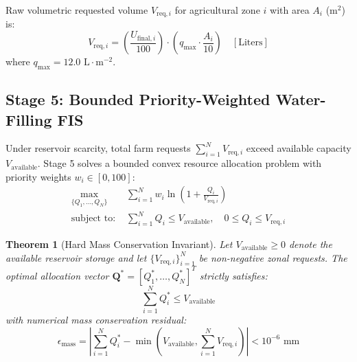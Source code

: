 \documentclass[conference]{IEEEtran}
\newtheorem{theorem}{Theorem}
\begin{document}
Raw volumetric requested volume $V_{\text{req}, i}$ for agricultural zone $i$ with area $A_i$ ($\text{m}^2$) is:
\begin{equation}
V_{\text{req}, i} = \left(\frac{U_{\text{final}, i}}{100}\right) \cdot \left(q_{\max} \cdot \frac{A_i}{10}\right) \quad [\text{Liters}]
\end{equation}
where $q_{\max} = 12.0\text{ L}\cdot\text{m}^{-2}$.

\subsection{Stage 5: Bounded Priority-Weighted Water-Filling FIS}
Under reservoir scarcity, total farm requests $\sum_{i=1}^N V_{\text{req}, i}$ exceed available capacity $V_{\text{available}}$. Stage 5 solves a bounded convex resource allocation problem with priority weights $w_i \in [0, 100]$:
\begin{align}
\max_{\{Q_1, \dots, Q_N\}} & \sum_{i=1}^N w_i \ln\left(1 + \frac{Q_i}{V_{\text{req}, i}}\right) \label{eq:opt_obj} \\
\text{subject to: } & \sum_{i=1}^N Q_i \le V_{\text{available}}, \quad 0 \le Q_i \le V_{\text{req}, i} \label{eq:opt_constraint}
\end{align}

\begin{theorem}[Hard Mass Conservation Invariant]
Let $V_{\text{available}} \ge 0$ denote the available reservoir storage and let $\{V_{\text{req}, i}\}_{i=1}^N$ be non-negative zonal requests. The optimal allocation vector $\mathbf{Q}^* = [Q_1^*, \dots, Q_N^*]^T$ strictly satisfies:
\begin{equation}
\sum_{i=1}^N Q_i^* \le V_{\text{available}}
\end{equation}
with numerical mass conservation residual:
\begin{equation}
\epsilon_{\text{mass}} = \left| \sum_{i=1}^N Q_i^* - \min\left(V_{\text{available}}, \sum_{i=1}^N V_{\text{req}, i}\right) \right| < 10^{-6}\text{ mm}
\end{equation}
\end{theorem}
\end{document}
